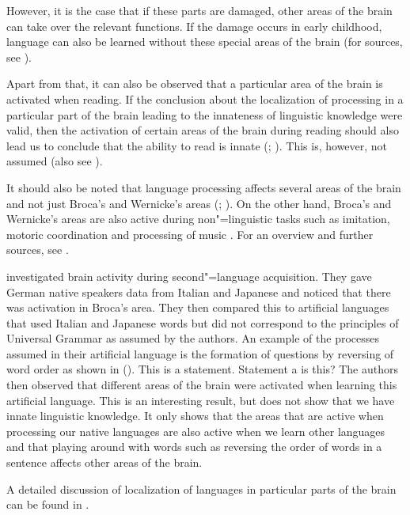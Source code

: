 However, it is the case that if these parts are damaged, other areas of the brain can take over the relevant
functions. If the damage occurs in early childhood, language can also be learned without these special areas
of the brain (for sources, see \citealp[Section~4.1]{Dabrowska2004a}).

Apart from that, it can also be observed that a particular area of the brain is activated when reading. If the conclusion about the localization of processing 
in a particular part of the brain leading to the innateness of linguistic knowledge were valid, then the activation of certain
areas of the brain during reading should also lead us to conclude that the ability to read is innate (\citealp[\page ]{EBJKSPP96a};
\citealp[]{Bishop2002a}). This is, however, not assumed (also see \citealp*[]{FHC2005a}). 

It should also be noted that language processing affects several areas of the brain and not just Broca's and Wernicke's areas (\citealp[]{FM2005a}; \citealp{Friederici2009a}). On the other hand, Broca's and Wernicke's areas are also active during non"=linguistic tasks
such as imitation, motoric coordination and processing of music \citep{MKGF2001a}. For an overview and further sources,
see .

\citet{MMGRRBW2003a} investigated brain activity during second"=language acquisition. They gave German native speakers data from Italian and Japanese and noticed
that there was activation in Broca's area. They then compared this to artificial languages that used Italian and Japanese words but did
not correspond to the principles of Universal Grammar as assumed by the authors. An example of the processes assumed in their artificial language is the formation
of questions by reversing of word order as shown in ().
\eal
\ex This is a statement.
\ex Statement a is this?
\zl
The authors then observed that different areas of the brain were activated when learning this artificial language. This is an interesting result, but does not show
that we have innate linguistic knowledge. It only shows that the areas that are active when processing our native languages are also active when we learn other
languages and that playing around with words such as reversing the order of words in a sentence affects other areas of the brain.

A detailed discussion of localization of languages in particular parts of the brain can be found
in .


